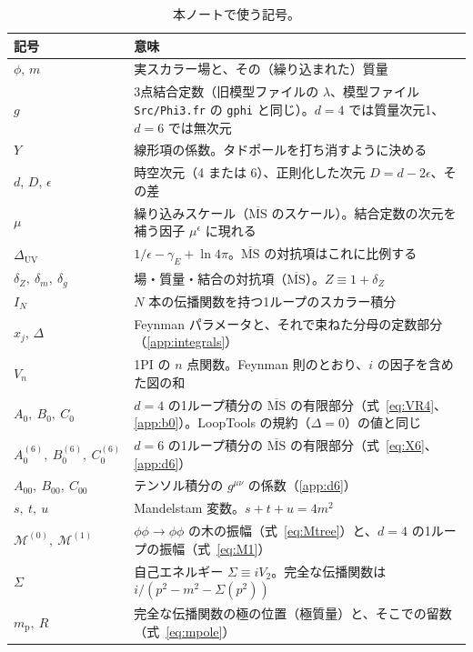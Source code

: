 \documentclass[a4paper,10pt]{ltjsarticle}
\begin{document}
\begin{table}[tbp]
\centering\small
\caption{本ノートで使う記号。}
\label{tab:notation}
\begin{tabularx}{\linewidth}{>{\raggedright\arraybackslash}p{3.3cm}X}
\toprule
\textbf{記号} & \textbf{意味} \\
\midrule
$\phi$, $m$ & 実スカラー場と、その（繰り込まれた）質量 \\
$g$ & 3点結合定数（旧模型ファイルの $\lambda$、模型ファイル \texttt{Src/Phi3.fr} の \texttt{gphi} と同じ）。$d=4$ では質量次元1、$d=6$ では無次元 \\
$Y$ & 線形項の係数。タドポールを打ち消すように決める \\
$d$, $D$, $\epsilon$ & 時空次元（4 または 6）、正則化した次元 $D=d-2\epsilon$、その差 \\
$\mu$ & 繰り込みスケール（$\overline{\mathrm{MS}}$ のスケール）。結合定数の次元を補う因子 $\mu^\epsilon$ に現れる \\
$\Delta_{\mathrm{UV}}$ & $1/\epsilon-\gamma_E+\ln4\pi$。$\overline{\mathrm{MS}}$ の対抗項はこれに比例する \\
$\delta_Z,\ \delta_m,\ \delta_g$ & 場・質量・結合の対抗項（$\overline{\mathrm{MS}}$）。$Z\equiv1+\delta_Z$ \\
$I_N$ & $N$ 本の伝播関数を持つ1ループのスカラー積分 \\
$x_j$, $\Delta$ & Feynman パラメータと、それで束ねた分母の定数部分（\ref{app:integrals}） \\
$V_n$ & 1PI の $n$ 点関数。Feynman 則のとおり、$i$ の因子を含めた図の和 \\
$A_0,\ B_0,\ C_0$ & $d=4$ の1ループ積分の $\overline{\mathrm{MS}}$ の有限部分（式~\eqref{eq:VR4}、\ref{app:b0}）。LoopTools の規約（$\Delta=0$）の値と同じ \\
$A_0^{(6)},\ B_0^{(6)},\ C_0^{(6)}$ & $d=6$ の1ループ積分の $\overline{\mathrm{MS}}$ の有限部分（式~\eqref{eq:X6}、\ref{app:d6}） \\
$A_{00},\ B_{00},\ C_{00}$ & テンソル積分の $g^{\mu\nu}$ の係数（\ref{app:d6}） \\
$s,\ t,\ u$ & Mandelstam 変数。$s+t+u=4m^2$ \\
$\mathcal{M}^{(0)},\ \mathcal{M}^{(1)}$ & $\phi\phi\to\phi\phi$ の木の振幅（式~\eqref{eq:Mtree}）と、$d=4$ の1ループの振幅（式~\eqref{eq:M1}） \\
$\Sigma$ & 自己エネルギー $\Sigma\equiv iV_2$。完全な伝播関数は $i/(p^2-m^2-\Sigma(p^2))$ \\
$m_{\mathrm p},\ R$ & 完全な伝播関数の極の位置（極質量）と、そこでの留数（式~\eqref{eq:mpole}） \\

\end{tabularx}
\end{table}
\end{document}
